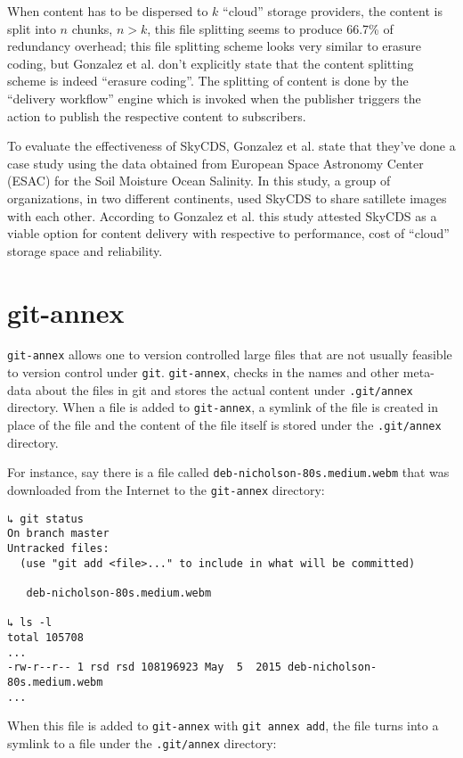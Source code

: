 When content has to be dispersed to $k$ ``cloud'' storage providers,
the content is split into $n$ chunks, $n > k$, this file splitting
seems to produce 66.7\% of redundancy overhead\cite{skycds}; this file
splitting scheme looks very similar to erasure coding, but Gonzalez et
al. don't explicitly state that the content splitting scheme is indeed
``erasure coding''. The splitting of content is done by the ``delivery
workflow'' engine which is invoked when the publisher triggers the
action to publish the respective content to subscribers.

To evaluate the effectiveness of SkyCDS, Gonzalez et al. state that
they've done a case study using the data obtained from European Space
Astronomy Center (ESAC) for the Soil Moisture Ocean Salinity. In this
study, a group of organizations, in two different continents, used
SkyCDS to share satillete images with each other. According to
Gonzalez et al. this study attested SkyCDS as a viable option for
content delivery with respective to performance, cost of ``cloud''
storage space and reliability.

\section{git-annex}\label{2-gitannex-sec}

\verb+git-annex+ allows one to version controlled large files that are
not usually feasible to version control under
\verb+git+\cite{program:git}. \verb+git-annex+, checks in the names
and other meta-data about the files in git and stores the actual
content under \verb+.git/annex+ directory. When a file is added to
\verb+git-annex+, a symlink of the file is created in place of the
file and the content of the file itself is stored under the
\verb+.git/annex+ directory.

For instance, say there is a file called
\verb+deb-nicholson-80s.medium.webm+ that was downloaded from the
Internet to the \verb+git-annex+ directory:

\begin{verbatim}
↳ git status
On branch master
Untracked files:
  (use "git add <file>..." to include in what will be committed)

   deb-nicholson-80s.medium.webm

↳ ls -l
total 105708
...
-rw-r--r-- 1 rsd rsd 108196923 May  5  2015 deb-nicholson-80s.medium.webm
...
\end{verbatim}

When this file is added to \verb+git-annex+ with \verb+git annex add+,
the file turns into a symlink to a file under the \verb+.git/annex+
directory:

